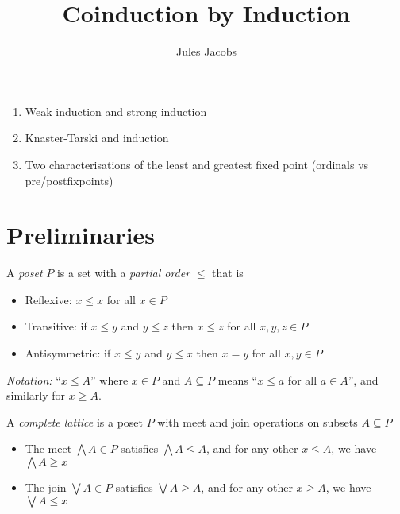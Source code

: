 

\newcommand{\tac}[1]{\lstinline[mathescape]~#1~}
\newcommand{\ciff}{\ \leftrightarrow\ }
\newcommand{\hyp}{\tac{H}}
\newcommand{\hypB}{\tac{G}}
\newcommand{\var}{\tac{x}}
\newcommand{\varB}{\tac{y}}

\newtheorem*{nlemma}{Lemma}

\DeclareMathOperator*{\tr}{tr}
\DeclareMathOperator*{\lcm}{lcm}



\title{Coinduction by Induction}
\author{Jules Jacobs}


\maketitle

\begin{enumerate}
  \item Weak induction and strong induction
  \item Knaster-Tarski and induction
  \item Two characterisations of the least and greatest fixed point (ordinals vs pre/postfixpoints)
\end{enumerate}

\section{Preliminaries}

\begin{definition}
  A \emph{poset} $P$ is a set with a \emph{partial order} $\leq$ that is
  \begin{itemize}
    \item Reflexive: $x \leq x$ for all $x \in P$
    \item Transitive: if $x \leq y$ and $y \leq z$ then $x \leq z$ for all $x,y,z \in P$
    \item Antisymmetric: if $x \leq y$ and $y \leq x$ then $x=y$ for all $x,y \in P$
  \end{itemize}

\end{definition}

\newcommand{\lb}[1]{\mathsf{lb}(#1)}
\newcommand{\ub}[1]{\mathsf{ub}(#1)}

\emph{Notation:} ``$x \leq A$'' where $x \in P$ and $A \subseteq P$ means ``$x \leq a$ for all $a \in A$'',
and similarly for $x \geq A$.

\begin{definition}
  A \emph{complete lattice} is a poset $P$ with meet and join operations on subsets $A \subseteq P$
  \begin{itemize}
    \item The meet $\bigwedge A \in P$ satisfies $\bigwedge A \leq A$, and for any other $x \leq A$, we have $\bigwedge A \geq x$
    \item The join $\bigvee A \in P$ satisfies $\bigvee A \geq A$, and for any other $x \geq A$, we have $\bigvee A \leq x$
  \end{itemize}
\end{definition}

